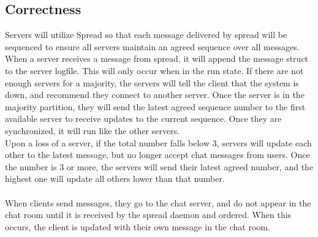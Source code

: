 \documentclass[12pt,journal,compsoc]{IEEEtran}
\begin{document}
\subsection{Correctness}
Servers will utilize Spread so that each message delivered by spread will be sequenced to ensure all servers maintain an agreed sequence over all messages.  When a server receives a message from spread, it will append the message struct to the server logfile.  This will only occur when in the run state.  If there are not enough servers for a majority, the servers will tell the client that the system is down, and recommend they connect to another server.  Once the server is in the majority partition, they will send the latest agreed sequence number to the first available server to receive updates to the current sequence.  Once they are synchronized, it will run like the other servers.
\\
Upon a loss of a server, if the total number falls below 3, servers will update each other to the latest message, but no longer accept chat messages from users.  Once the number is 3 or more, the servers will send their latest agreed number, and the highest one will update all others lower than that number.\\
\\
When clients send messages, they go to the chat server, and do not appear in the chat room until it is received by the spread daemon and ordered.  When this occurs, the client is updated with their own message in the chat room.
\end{document}
